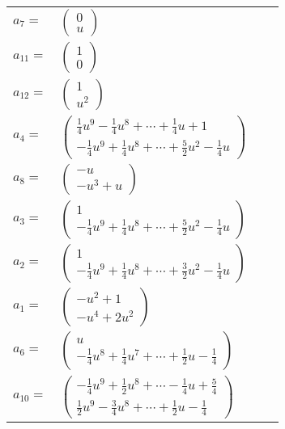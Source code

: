 \documentclass[1p]{elsarticle_modified}
\theoremstyle{definition}
\begin{document}
\begin{tabular}{m{7pt} m{180pt} m{7pt} m{180pt} }
\flushright $a_{7}=$&$\begin{pmatrix}0\\u\end{pmatrix}$ \\
\flushright $a_{11}=$&$\begin{pmatrix}1\\0\end{pmatrix}$ \\
\flushright $a_{12}=$&$\begin{pmatrix}1\\u^2\end{pmatrix}$ \\
\flushright $a_{4}=$&$\begin{pmatrix}\frac{1}{4} u^9-\frac{1}{4} u^8+\cdots+\frac{1}{4} u+1\\-\frac{1}{4} u^9+\frac{1}{4} u^8+\cdots+\frac{5}{2} u^2-\frac{1}{4} u\end{pmatrix}$ \\
\flushright $a_{8}=$&$\begin{pmatrix}- u\\- u^3+u\end{pmatrix}$ \\
\flushright $a_{3}=$&$\begin{pmatrix}1\\-\frac{1}{4} u^9+\frac{1}{4} u^8+\cdots+\frac{5}{2} u^2-\frac{1}{4} u\end{pmatrix}$ \\
\flushright $a_{2}=$&$\begin{pmatrix}1\\-\frac{1}{4} u^9+\frac{1}{4} u^8+\cdots+\frac{3}{2} u^2-\frac{1}{4} u\end{pmatrix}$ \\
\flushright $a_{1}=$&$\begin{pmatrix}- u^2+1\\- u^4+2 u^2\end{pmatrix}$ \\
\flushright $a_{6}=$&$\begin{pmatrix}u\\-\frac{1}{4} u^8+\frac{1}{4} u^7+\cdots+\frac{1}{2} u-\frac{1}{4}\end{pmatrix}$ \\
\flushright $a_{10}=$&$\begin{pmatrix}-\frac{1}{4} u^9+\frac{1}{2} u^8+\cdots-\frac{1}{4} u+\frac{5}{4}\\\frac{1}{2} u^9-\frac{3}{4} u^8+\cdots+\frac{1}{2} u-\frac{1}{4}\end{pmatrix}$ \\

\end{tabular}
\end{document}
